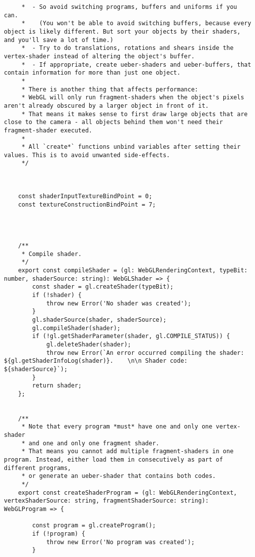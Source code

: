 \begin{lstlisting}
     *  - So avoid switching programs, buffers and uniforms if you can.
     *    (You won't be able to avoid switching buffers, because every object is likely different. But sort your objects by their shaders, and you'll save a lot of time.)
     *  - Try to do translations, rotations and shears inside the vertex-shader instead of altering the object's buffer.
     *  - If appropriate, create ueber-shaders and ueber-buffers, that contain information for more than just one object.
     *
     * There is another thing that affects performance:
     * WebGL will only run fragment-shaders when the object's pixels aren't already obscured by a larger object in front of it.
     * That means it makes sense to first draw large objects that are close to the camera - all objects behind them won't need their fragment-shader executed.
     *
     * All `create*` functions unbind variables after setting their values. This is to avoid unwanted side-effects.
     */
    
    
    
    const shaderInputTextureBindPoint = 0;
    const textureConstructionBindPoint = 7;
    
    
    
    
    /**
     * Compile shader.
     */
    export const compileShader = (gl: WebGLRenderingContext, typeBit: number, shaderSource: string): WebGLShader => {
        const shader = gl.createShader(typeBit);
        if (!shader) {
            throw new Error('No shader was created');
        }
        gl.shaderSource(shader, shaderSource);
        gl.compileShader(shader);
        if (!gl.getShaderParameter(shader, gl.COMPILE_STATUS)) {
            gl.deleteShader(shader);
            throw new Error(`An error occurred compiling the shader: ${gl.getShaderInfoLog(shader)}.    \n\n Shader code: ${shaderSource}`);
        }
        return shader;
    };
    
    
    /**
     * Note that every program *must* have one and only one vertex-shader
     * and one and only one fragment shader.
     * That means you cannot add multiple fragment-shaders in one program. Instead, either load them in consecutively as part of different programs,
     * or generate an ueber-shader that contains both codes.
     */
    export const createShaderProgram = (gl: WebGLRenderingContext, vertexShaderSource: string, fragmentShaderSource: string): WebGLProgram => {
    
        const program = gl.createProgram();
        if (!program) {
            throw new Error('No program was created');
        }
    

\end{lstlisting}
